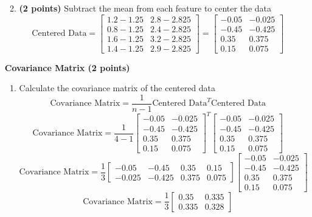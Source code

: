 \documentclass[a3paper,12pt]{extarticle} %
\begin{document}
\begin{enumerate}
\begin{enumerate}
\[        \]
        \item \textbf{(2 points)} Subtract the mean from each feature to center the data
        \[
        \text{Centered Data} = \begin{bmatrix}1.2 - 1.25 & 2.8 - 2.825\\0.8 - 1.25 & 2.4 - 2.825\\1.6 - 1.25 & 3.2 - 2.825\\1.4 - 1.25 & 2.9 - 2.825\end{bmatrix} = \begin{bmatrix}-0.05 & -0.025\\-0.45 & -0.425\\0.35 & 0.375\\0.15 & 0.075\end{bmatrix}
        \]
    \end{enumerate}
    \subitem \textbf{Covariance Matrix (2 points)}
    \begin{enumerate}
        \item Calculate the covariance matrix of the centered data
    \[
    \text{Covariance Matrix} = \frac{1}{n-1} \text{Centered Data}^T \text{Centered Data}
    \]
    \[
    \text{Covariance Matrix} = \frac{1}{4-1} \begin{bmatrix}-0.05 & -0.025\\-0.45 & -0.425\\0.35 & 0.375\\0.15 & 0.075\end{bmatrix}^T \begin{bmatrix}-0.05 & -0.025\\-0.45 & -0.425\\0.35 & 0.375\\0.15 & 0.075\end{bmatrix}
    \]
    \[
    \text{Covariance Matrix} = \frac{1}{3} \begin{bmatrix}-0.05 & -0.45 & 0.35 & 0.15\\-0.025 & -0.425 & 0.375 & 0.075\end{bmatrix} \begin{bmatrix}-0.05 & -0.025\\-0.45 & -0.425\\0.35 & 0.375\\0.15 & 0.075\end{bmatrix}
    \]
    \[
    \text{Covariance Matrix} = \frac{1}{3} \begin{bmatrix}0.35  & 0.335\\0.335 & 0.328\end{bmatrix}
\]
\end{enumerate}
\end{enumerate}
\end{document}
